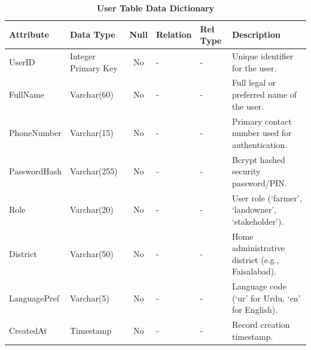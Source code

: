 \documentclass{FastFyp}
\begin{document}
\begin{table}[!htbp]
\footnotesize
\centering
\caption{\label{tab:user_table} \textbf{User Table Data Dictionary}}
\begin{tabular}{|l|l|c|l|l|p{4.5cm}|}
\hline
\textbf{Attribute} & \textbf{Data Type} & \textbf{Null} & \textbf{Relation} & \textbf{Rel Type} & \textbf{Description} \\ \hline
UserID & Integer Primary Key & No & - & - & Unique identifier for the user. \\ \hline
FullName & Varchar(60) & No & - & - & Full legal or preferred name of the user. \\ \hline
PhoneNumber & Varchar(15) & No & - & - & Primary contact number used for authentication. \\ \hline
PasswordHash & Varchar(255) & No & - & - & Bcrypt hashed security password/PIN. \\ \hline
Role & Varchar(20) & No & - & - & User role (`farmer', `landowner', `stakeholder'). \\ \hline
District & Varchar(50) & No & - & - & Home administrative district (e.g., Faisalabad). \\ \hline
LanguagePref & Varchar(5) & No & - & - & Language code (`ur' for Urdu, `en' for English). \\ \hline
CreatedAt & Timestamp & No & - & - & Record creation timestamp. \\ \hline
\end{tabular}
\end{table}
\end{document}
